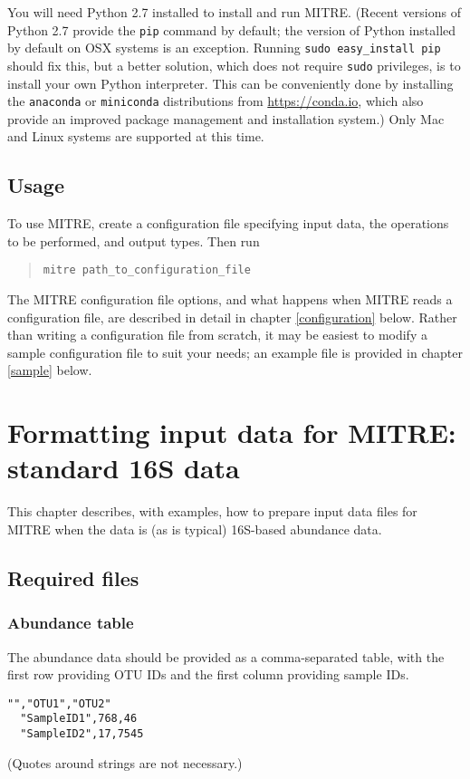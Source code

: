 \documentclass[12pt]{report}
\begin{document}
You will need Python 2.7 installed to install and run MITRE. (Recent
versions of Python 2.7 provide the \texttt{pip} command by default;
the version of Python installed by default on OSX systems is an
exception. Running \texttt{sudo easy\_install pip} should fix this,
but a better solution, which does not require \texttt{sudo}
privileges, is to install your own Python interpreter. This can be
conveniently done by installing the \texttt{anaconda} or
\texttt{miniconda} distributions from \url{https://conda.io}, which
also provide an improved package management and installation system.)
Only Mac and Linux systems are supported at this time.

\section{Usage}
To use MITRE, create a configuration file specifying input data, the
operations to be performed, and output types. Then run \begin{quote} \texttt{mitre
  path\_to\_configuration\_file} \end{quote} The MITRE configuration file
options, and what happens when MITRE reads a configuration file, are
described in detail in chapter \ref{configuration} below. Rather than
writing a configuration file from scratch, it may be easiest to modify
a sample configuration file to suit your needs; an example file is
provided in chapter \ref{sample} below.


\chapter{Formatting input data for MITRE: standard 16S data}
This chapter describes, with examples, how to prepare input data files
for MITRE when the data is (as is typical) 16S-based abundance data.


\section{Required files}
\subsection{Abundance table}\label{abundance_data}
The abundance data should be provided as a comma-separated table,
with the first row providing OTU IDs and the first column providing
sample IDs.
\begin{lstlisting}[caption=Example abundance data table]
  "","OTU1","OTU2"
  "SampleID1",768,46
  "SampleID2",17,7545
\end{lstlisting}
(Quotes around strings are not necessary.)
\end{document}
